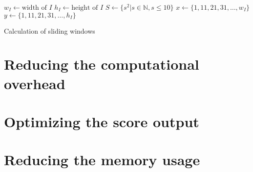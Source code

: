 \begin{algorithm}
    $w_I \gets \text{width of }I$\;
    $h_I \gets \text{height of }I$\;
    $S \gets \{s^2 | s \in \mathbb{N}, s \le 10 \}$\;
    $x \gets \{1, 11, 21, 31,\dots, w_I\}$\;
    $y \gets \{1, 11, 21, 31,\dots, h_I\}$\;
    \caption{Calculation of sliding windows}
    \label{alg:calc_windows}
\end{algorithm}

\section{Reducing the computational overhead}


\section{Optimizing the score output}


\section{Reducing the memory usage}

